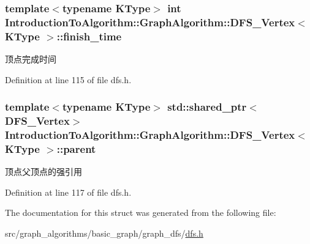 \subsubsection[{finish\+\_\+time}]{\setlength{\rightskip}{0pt plus 5cm}template$<$typename K\+Type$>$ int {\bf Introduction\+To\+Algorithm\+::\+Graph\+Algorithm\+::\+D\+F\+S\+\_\+\+Vertex}$<$ K\+Type $>$\+::finish\+\_\+time}\label{struct_introduction_to_algorithm_1_1_graph_algorithm_1_1_d_f_s___vertex_aa0f17c70784c1dcc199487e519814e61}
顶点完成时间 

Definition at line 115 of file dfs.\+h.

\hypertarget{struct_introduction_to_algorithm_1_1_graph_algorithm_1_1_d_f_s___vertex_ad243c81b3c0705a136b6a1e5debdb6ed}{}
\subsubsection[{parent}]{\setlength{\rightskip}{0pt plus 5cm}template$<$typename K\+Type$>$ std\+::shared\+\_\+ptr$<${\bf D\+F\+S\+\_\+\+Vertex}$>$ {\bf Introduction\+To\+Algorithm\+::\+Graph\+Algorithm\+::\+D\+F\+S\+\_\+\+Vertex}$<$ K\+Type $>$\+::parent}\label{struct_introduction_to_algorithm_1_1_graph_algorithm_1_1_d_f_s___vertex_ad243c81b3c0705a136b6a1e5debdb6ed}
顶点父顶点的强引用 

Definition at line 117 of file dfs.\+h.



The documentation for this struct was generated from the following file\+:\begin{DoxyCompactItemize}
\item 
src/graph\+\_\+algorithms/basic\+\_\+graph/graph\+\_\+dfs/\hyperlink{dfs_8h}{dfs.\+h}\end{DoxyCompactItemize}
